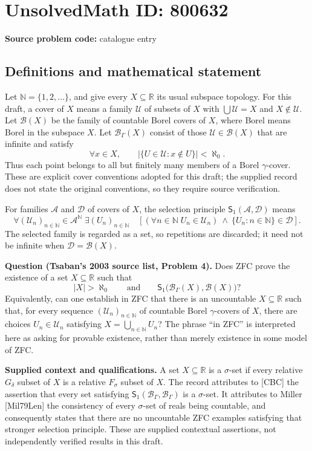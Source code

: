 \documentclass[11pt]{article}
\newcommand{\N}{\mathbb{N}}
\newcommand{\R}{\mathbb{R}}
\begin{document}
\section*{UnsolvedMath ID: 800632}
\textbf{Source problem code:} catalogue entry
\subsection{Definitions and mathematical statement}
Let \(\N=\{1,2,\ldots\}\), and give every \(X\subseteq\R\) its usual subspace topology. For this draft, a cover of \(X\) means a family \(\mathcal U\) of subsets of \(X\) with \(\bigcup\mathcal U=X\) and \(X\notin\mathcal U\). Let \(\mathcal B(X)\) be the family of countable Borel covers of \(X\), where Borel means Borel in the subspace \(X\). Let \(\mathcal B_\Gamma(X)\) consist of those \(\mathcal U\in\mathcal B(X)\) that are infinite and satisfy
\[
\forall x\in X,\qquad \bigl|\{U\in\mathcal U:x\notin U\}\bigr|<\aleph_0.
\]
Thus each point belongs to all but finitely many members of a Borel \(\gamma\)-cover. These are explicit cover conventions adopted for this draft; the supplied record does not state the original conventions, so they require source verification.

For families \(\mathscr A\) and \(\mathscr D\) of covers of \(X\), the selection principle \(\mathsf S_1(\mathscr A,\mathscr D)\) means
\[
\forall (\mathcal U_n)_{n\in\N}\in\mathscr A^{\N}\;
\exists (U_n)_{n\in\N}\quad
\left[(\forall n\in\N\;U_n\in\mathcal U_n)
\ \land\ \{U_n:n\in\N\}\in\mathscr D\right].
\]
The selected family is regarded as a set, so repetitions are discarded; it need not be infinite when \(\mathscr D=\mathcal B(X)\).

\textbf{Question (Tsaban's 2003 source list, Problem 4).} Does ZFC prove the existence of a set \(X\subseteq\R\) such that
\[
|X|>\aleph_0
\qquad\text{and}\qquad
\mathsf S_1\bigl(\mathcal B_\Gamma(X),\mathcal B(X)\bigr)?
\]
Equivalently, can one establish in ZFC that there is an uncountable \(X\subseteq\R\) such that, for every sequence \((\mathcal U_n)_{n\in\N}\) of countable Borel \(\gamma\)-covers of \(X\), there are choices \(U_n\in\mathcal U_n\) satisfying \(X=\bigcup_{n\in\N}U_n\)? The phrase ``in ZFC'' is interpreted here as asking for provable existence, rather than merely existence in some model of ZFC.

\textbf{Supplied context and qualifications.} A set \(X\subseteq\R\) is a \(\sigma\)-set if every relative \(G_\delta\) subset of \(X\) is a relative \(F_\sigma\) subset of \(X\). The record attributes to [CBC] the assertion that every set satisfying \(\mathsf S_1(\mathcal B_\Gamma,\mathcal B_\Gamma)\) is a \(\sigma\)-set. It attributes to Miller [Mil79Len] the consistency of every \(\sigma\)-set of reals being countable, and consequently states that there are no uncountable ZFC examples satisfying that stronger selection principle. These are supplied contextual assertions, not independently verified results in this draft.
\end{document}
